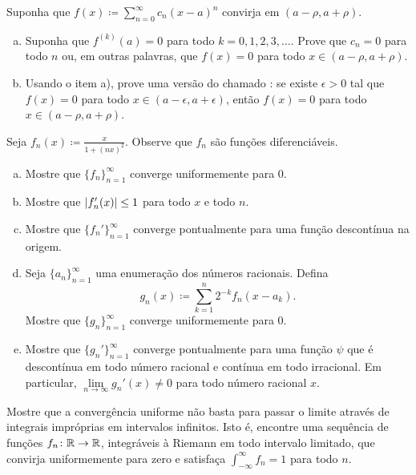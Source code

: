 \begin{exercise}
\pagebreak[3]
Suponha que $f(x) \coloneqq \sum_{n=0}^\infty c_n {(x-a)}^n$ convirja em $(a-\rho,a+\rho)$.
\begin{enumerate}[a)]
\item
Suponha que $f^{(k)}(a) = 0$ para todo $k=0,1,2,3,\ldots$. Prove que
$c_n = 0$ para todo $n$ ou, em outras palavras, que
$f(x) = 0$ para todo $x \in (a-\rho,a+\rho)$.
\item
Usando o item a), prove uma versão do chamado
: se existe
$\epsilon > 0$ tal que $f(x) = 0$ para todo $x \in (a-\epsilon, a+\epsilon)$,
então $f(x) = 0$ para todo $x \in (a-\rho,a+\rho)$.
\end{enumerate}
\end{exercise}

\begin{exercise}
Seja $f_n(x) \coloneqq \frac{x}{1+{(nx)}^2}$. Observe que $f_n$ são
funções diferenciáveis.
\begin{enumerate}[a)]
\item
Mostre que $\{ f_n \}_{n=1}^\infty$ converge uniformemente para 0.
\item
Mostre que $\lvert {f_n'(x)} \rvert \leq 1$ para todo $x$ e todo $n$.
\item
Mostre que $\{ f_n' \}_{n=1}^\infty$ converge pontualmente para uma
função descontínua na origem.
\item
Seja $\{ a_n \}_{n=1}^\infty$ uma enumeração dos números racionais.
Defina
\begin{equation*}
g_n(x) \coloneqq \sum_{k=1}^n 2^{-k} f_n(x-a_k) .
\end{equation*}
Mostre que $\{ g_n \}_{n=1}^\infty$ converge uniformemente para 0.
\item
Mostre que $\{ g_n' \}_{n=1}^\infty$ converge pontualmente para uma função
$\psi$ que é descontínua em todo número racional e contínua em todo
irracional. Em particular, $\lim\limits_{n\to\infty} g_n'(x) \neq 0$ para
todo número racional $x$.
\end{enumerate}
\end{exercise}

\begin{exercise}
Mostre que a convergência uniforme não basta para passar o limite através
de integrais impróprias em intervalos infinitos.
Isto é, encontre uma sequência de funções $f_n \colon {\mathbb{R}} \to {\mathbb{R}}$,
integráveis à Riemann em todo intervalo limitado, que convirja
uniformemente para zero e satisfaça $\int_{-\infty}^\infty f_n = 1$ para
todo $n$.
\end{exercise}


